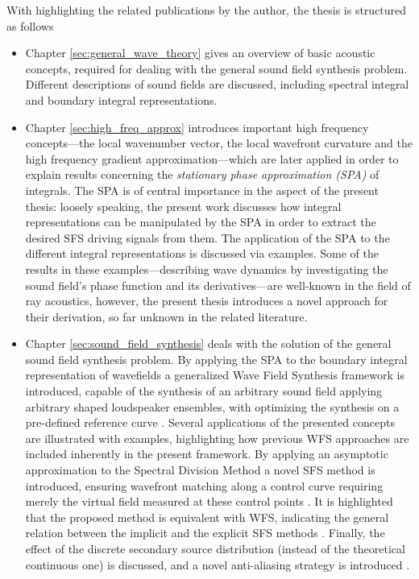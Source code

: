 With highlighting the related publications by the author, the thesis is structured as follows
\begin{itemize}
\item Chapter \ref{sec:general_wave_theory} gives an overview of basic acoustic concepts, required for dealing with the general sound field synthesis problem.
Different descriptions of sound fields are discussed, including spectral integral and boundary integral representations.
%
\item Chapter \ref{sec:high_freq_approx} introduces important high frequency concepts---the local wavenumber vector, the local wavefront curvature and the high frequency gradient approximation---which are later applied in order to explain results concerning the \emph{stationary phase approximation (SPA)} of integrals.
The SPA is of central importance in the aspect of the present thesis: loosely speaking, the present work discusses how integral representations can be manipulated by the SPA in order to extract the desired SFS driving signals from them.
The application of the SPA to the different integral representations is discussed via examples.
Some of the results in these examples---describing wave dynamics by investigating the sound field's phase function and its derivatives---are well-known in the field of ray acoustics, however, the present thesis introduces a novel approach for their derivation, so far unknown in the related literature.
%
\item Chapter \ref{sec:sound_field_synthesis} deals with the solution of the general sound field synthesis problem.
By applying the SPA to the boundary integral representation of wavefields a generalized Wave Field Synthesis framework is introduced, capable of the synthesis of an arbitrary sound field applying arbitrary shaped loudspeaker ensembles, with optimizing the synthesis on a pre-defined reference curve \cite{Firtha2016, schultz2017wave}.
Several applications of the presented concepts are illustrated with examples, highlighting how previous WFS approaches are included inherently in the present framework.
By applying an asymptotic approximation to the Spectral Division Method a novel SFS method is introduced, ensuring wavefront matching along a control curve requiring merely the virtual field measured at these control points \cite{Firtha2017:daga}.
It is highlighted that the proposed method is equivalent with WFS, indicating the general relation between the implicit and the explicit SFS methods \cite{Firtha2018:WFS_vs_SDM, Schultz2019:HOA_vs_WFS}.
Finally, the effect of the discrete secondary source distribution (instead of the theoretical continuous one) is discussed, and a novel anti-aliasing strategy is introduced \cite{Firtha2018_daga_a, 8611109}.

\end{itemize}
